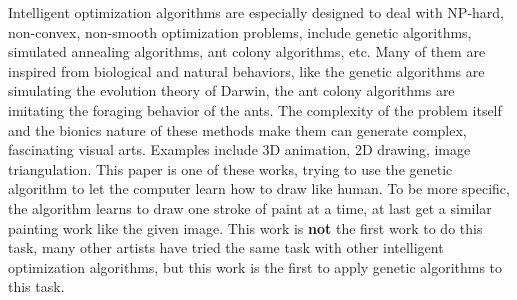 \documentclass[a4paper,conference]{IEEEtran}
\begin{document}
Intelligent optimization algorithms are especially designed to deal with NP-hard, non-convex, non-smooth optimization problems, include genetic algorithms, simulated annealing algorithms, ant colony algorithms, etc. Many of them are inspired from biological and natural behaviors, like the genetic algorithms are simulating the evolution theory of Darwin, the ant colony algorithms are imitating the foraging behavior of the ants. The complexity of the problem itself and the bionics nature of these methods make them can generate complex, fascinating visual arts. Examples include 3D animation\cite{e22111284}, 2D drawing\cite{ant-colony}, image triangulation\cite{triangula}. This paper is one of these works, trying to use the genetic algorithm to let the computer learn how to draw like human. To be more specific, the algorithm learns to draw one stroke of paint at a time, at last get a similar painting work like the given image. This work is \textbf{not} the first work to do this task, many other artists have tried the same task with other intelligent optimization algorithms\cite{ant-colony}\cite{primitive}\cite{geometrize}, but this work is the first to apply genetic algorithms to this task.
\end{document}
